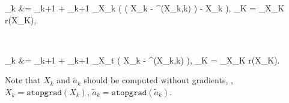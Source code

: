 \begin{algorithm}[h]
{{    \begin{talign}
    \begin{split} \label{eq:Euler_lean_adjoint_DDIM}
        _{k} 
        &= _{k+1} + _{k+1}\tran{} \nabla_{X_k} \left(
         \big( X_k -  \epsilon^{}(X_k,k) \big) - X_k
        \right), \qquad 
        _K = \nabla_{X_K} r(X_K),
    \end{split} \\
    \begin{split}
         _{k} 
        &= _{k+1} + _{k+1}\tran{} \nabla_{X_t} \left(
        X_k -  \epsilon^{}(X_k,k)
        \right), \qquad 
        _K = \nabla_{X_K} r(X_K).
    \end{split} \label{eq:Euler_lean_adjoint_DDIM_2}
    \end{talign}
    Note that $X_k$ and $\tilde{a}_k$ should be computed without gradients, \ie, $X_k = \texttt{stopgrad}(X_k)$, $\tilde{a}_k = \texttt{stopgrad}(\tilde{a}_k)$. \vspace{0.5em}

}}
\end{algorithm}
